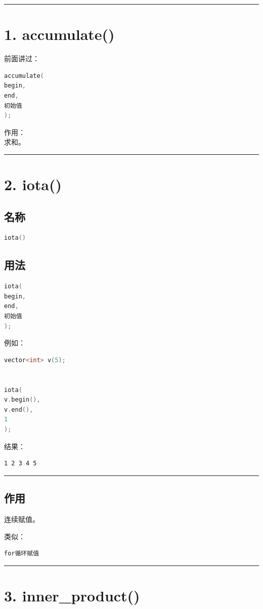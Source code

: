 \documentclass[10pt,twocolumn]{extarticle}
\begin{document}
\noindent\rule{\linewidth}{0.4pt}

\section{1. accumulate()}

前面讲过：
\begin{lstlisting}[language=C++]
accumulate(
begin,
end,
初始值
);
\end{lstlisting}
作用：\\
求和。

\noindent\rule{\linewidth}{0.4pt}

\section{2. iota()}

\subsection{名称}
\begin{lstlisting}[language=C++]
iota()
\end{lstlisting}

\subsection{用法}
\begin{lstlisting}[language=C++]
iota(
begin,
end,
初始值
);
\end{lstlisting}
例如：
\begin{lstlisting}[language=C++]
vector<int> v(5);


iota(
v.begin(),
v.end(),
1
);
\end{lstlisting}
结果：
\begin{lstlisting}
1 2 3 4 5
\end{lstlisting}

\noindent\rule{\linewidth}{0.4pt}

\subsection{作用}
连续赋值。

类似：
\begin{lstlisting}[language=C++]
for循环赋值
\end{lstlisting}

\noindent\rule{\linewidth}{0.4pt}

\section{3. inner\_product()}
\end{document}
